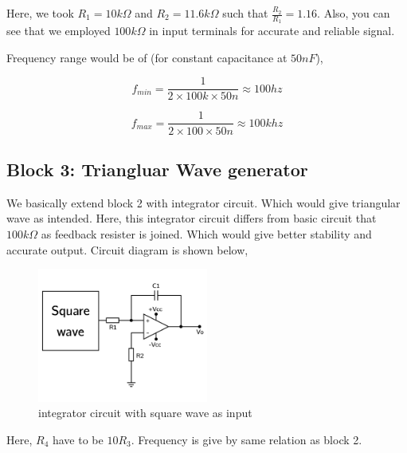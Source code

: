 \documentclass{article}
\begin{document}
Here, we took \(R_{1} = 10k\Omega\) and \(R_{2} = 11.6k\Omega\) such that \(\frac{R_{2}}{R_{1}}=1.16\). Also, you can see that we employed \(100k\Omega\) in input terminals for accurate and reliable signal.

Frequency range would be of (for constant capacitance at \(50nF\)),

\begin{equation*}
\label{eq:org34ca56b}
  f_{min} =\frac{1}{2\times 100k\times 50n} \approx 100 hz
\end{equation*}

\begin{equation*}
\label{eq:org52cfe5e}
  f_{max} =\frac{1}{2\times 100 \times 50n} \approx 100 khz
\end{equation*}


\subsection{Block 3: Triangluar Wave generator}
\label{sec:org4d16424}

We basically extend block 2 with integrator circuit. Which would give triangular wave as intended. Here, this integrator circuit differs from basic circuit that \(100k\Omega\) as feedback resister is joined. Which would give better stability and accurate output. Circuit diagram is shown below,


\begin{figure}[H]
    \centering
    \label{triang}
    \includegraphics[width=0.5\textwidth]{imgs/triang.png}
    \caption{integrator circuit with square wave as input}
\end{figure}



Here, \(R_{4}\) have to be \(10R_{3}\). Frequency is give by same relation as block 2.
\end{document}
